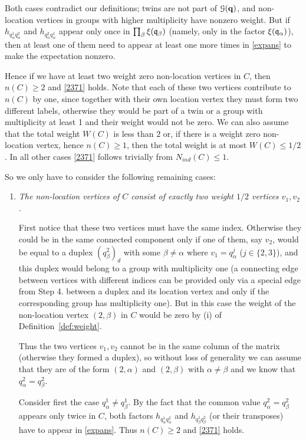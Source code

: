 \documentclass[draft]{article}
\newcommand{\bq}{{\bf {q}}}
\newcommand{\fq}{{\frak q}}
\newcommand{\al}{\alpha}
\newcommand{\cG}{{\mathcal G}}
\numberwithin{equation}{section}
\numberwithin{theorem}{section}
\numberwithin{definition}{section}
\numberwithin{remark}{section}
\begin{document}
\begin{description}
Both cases contradict  our definitions; twins are
not part of $\cG(\bq)$, and non-location vertices in 
groups with higher multiplicity have nonzero weight.
 But if  $h_ {q^1_\alpha  q^2_\alpha}$ and $h_ {q^2_\alpha  q^1_\alpha}$
 appear only once in  $\prod_\beta \xi(\fq_\beta)$  (namely, only in
the factor $\xi(\fq_\al)$), then at least one of them
 need to appear at least one more times in \eqref{expans} 
 to make the expectation nonzero. 

Hence if we have at least 
two weight zero non-location vertices in $C$, then $n(C)\ge2$  and \eqref{2371} holds.
Note that each of these two vertices contribute to  $n(C)$ by one,
since together with their own location vertex they
must form two different labels,
otherwise they would be part of a twin or a group with multiplicity 
at least 1 and their weight  would not be zero. We can also
 assume that the total weight $W(C)$ is less than $2$ or, 
if there is a weight zero non-location vertex, hence $n(C)\ge 1$, then
 the total weight is at most $W(C)\le 1/2$. In all other cases
\eqref{2371} follows trivially from $N_{ind}(C)\le1$.

 
So we only have to consider the following remaining cases: 


\begin{enumerate} 
\item  {\it  The non-location vertices of $C$  consist of exactly two weight $1/2$ vertices
$v_1, v_2$.} 


First notice that these two vertices  must have the 
same index.
Otherwise they could be in the same connected component only
if  one of them, say $v_2$, would be
equal to a duplex $(q_\beta^2)_d$ with some $\beta\ne\al$
where $v_1=q_\al^j$ ($j\in \{2,3\}$),
and this duplex would belong to a group with
multiplicity one (a connecting edge between vertices
with different indices can be provided only via
a special edge from Step 4. between a duplex and its location vertex
and only if the corresponding group has multiplicity one).
But in this case the weight of the non-location vertex $(2,\beta)$ in $C$
would be zero by (i) of Definition~\ref{def:weight}.

Thus the two vertices $v_1, v_2$ cannot be in the same
column of the matrix (otherwise they formed a duplex),
so without loss of
generality we can assume that they are of the form
$(2,\al)$ and $(2,\beta)$ with $\al\ne \beta$
and  we know that $ q^2_\alpha =   q^2_\beta$.


Consider first the case  $ q^1_\alpha\ne  q^1_\beta$.
 By the fact that the common value  $ q^2_\alpha =   q^2_\beta$
appears only twice in $C$, both
factors
  $h_ {q^1_\alpha  q^2_\alpha}$ and $h_ {q^1_\beta  q^2_\beta}$ (or their transposes) 
have to appear in \eqref{expans}. 
 Thus  $n(C) \ge 2$ and  \eqref{2371} holds.


\end{enumerate}
\end{description}
\end{document}
